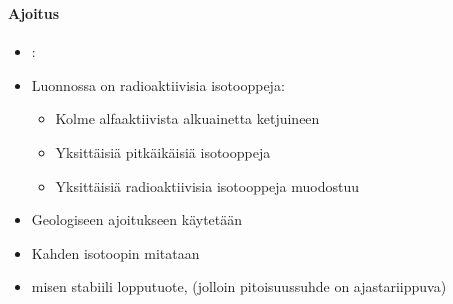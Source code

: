 \begin{frame}
\frametitle{\texorpdfstring{\culine[\sectiontitleulinecolor]{\sectiontitle}}{\sectiontitle} }
\framesubtitle{Ajoitus}
\appear{}

\begin{itemize}
	\item[] :
\end{itemize}
	
\semismall
\begin{itemize}
	\item Luonnossa on radioaktiivisia isotooppeja:
\begin{itemize}
	\item[(1)] Kolme alfaaktiivista alkuainetta ketjuineen 
\item[(2)] Yksittäisiä pitkäikäisiä isotooppeja 
\item[(3)] Yksittäisiä radioaktiivisia isotooppeja muodostuu  
\end{itemize}

\item Geologiseen ajoitukseen käytetään   

\item Kahden isotoopin  mitataan%
\end{itemize}

\vspace{-0.3mm}
\begin{minipage}{6.45cm}
\begin{itemize}
	\item[] misen stabiili lopputuote, (jolloin pi\-toi\-suus\-suhde on ajastariippuva)
\end{itemize}
\end{minipage}



\end{frame}
